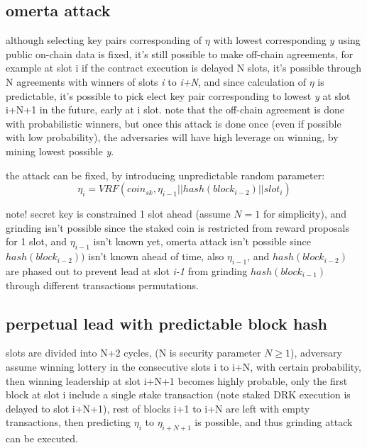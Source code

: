 \documentclass[a4paper]{article}
\begin{document}
\subsection {omerta attack}
although selecting key pairs corresponding of $\eta$ with lowest corresponding $y$ using public on-chain data is fixed, it's still possible to make off-chain agreements, for example at slot i if the contract execution is delayed N slots, it's possible through N agreements with winners of slots \emph{i} to \emph{i+N}, and since calculation of $\eta$ is predictable, it's possible to pick elect key pair corresponding to lowest \emph{y} at slot i+N+1 in the future, early at i slot.
note that the off-chain agreement is done with probabilistic winners, but once this attack is done once (even if possible with low probability), the adversaries will have high leverage on winning, by mining lowest possible \emph{y}.

the attack can be fixed, by introducing unpredictable random parameter: $$\eta_i = VRF(coin_{sk}, \eta_{i-1}||hash(block_{i-2})||slot_i)$$


note! secret key is constrained 1 slot ahead (assume $N=1$ for simplicity), and grinding isn't possible since the staked coin is restricted from reward proposals for 1 slot, and $\eta_{i-1}$ isn't known yet, omerta attack isn't possible since $hash(block_{i-2}))$ isn't known ahead of time, also $\eta_{i-1}$, and $hash(block_{i-2})$ are phased out to prevent lead at slot \emph{i-1} from grinding $hash(block_{i-1})$  through different transactions permutations.

\subsection {perpetual lead with predictable block hash}


slots are divided into N+2 cycles, (N is security parameter $N \ge 1$), adversary assume winning lottery in the consecutive slots i to i+N, with certain probability, then winning leadership at slot i+N+1 becomes highly probable, only the first block at slot i include a single stake transaction (note staked DRK execution is delayed to slot i+N+1), rest of blocks i+1 to i+N are left with empty transactions, then predicting $\eta_i$ to $\eta_{i+N+1}$ is possible, and thus grinding attack can be executed.
\end{document}
